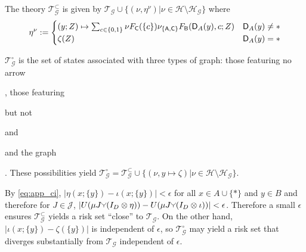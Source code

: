\begin{example}
The theory $\mathscr{T}_{\mathcal{G}}^\subset$ is given by $\mathscr{T}_{\mathcal{G}}\cup\{(\nu,\eta^\nu )|\nu \in \mathscr{H}\setminus\mathscr{H}_\mathcal{G}\}$ where 
\begin{align}
    \eta^\nu:=\begin{cases}(y;Z)\mapsto \sum_{c\in\{0,1\}} \nu F_{\mathsf{C}}(\{c\}) \nu_{\{\mathsf{A},\mathsf{C}\}} F_{\mathsf{B}}(\mathsf{D}_A(y),c;Z) &\mathsf{D}_A(y)\neq *\\
    \zeta(Z) &\mathsf{D}_A(y)=*\end{cases}
\end{align}

$\mathscr{T}_{\mathcal{G}}^\circ$ is the set of states associated with three types of graph: those featuring no arrow , those featuring  but not  and  and the graph . These possibilities yield $\mathscr{T}_{\mathcal{G}}^\circ=\mathscr{T}_{\mathcal{G}}^\subset\cup\{(\nu,y\mapsto \zeta)|\nu \in \mathscr{H}\setminus\mathscr{H}_\mathcal{G}\}$.

By \ref{eq:app_ci}, $|\eta(x;\{y\})-\iota(x;\{y\})|<\epsilon$ for all $x\in A\cup\{*\}$ and $y\in B$ and therefore for $J\in \mathscr{J}$, $|U(\mu J\splitter{0.1} (I_D\otimes \eta)) - U(\mu J\splitter{0.1} (I_D\otimes \iota))|<\epsilon$. Therefore a small $\epsilon$ ensures $\mathscr{T}^\subset_{\mathcal{G}}$ yields a risk set ``close'' to $\mathscr{T}_{\mathcal{G}}$. On the other hand, $|\iota(x;\{y\})-\zeta(\{y\})|$ is independent of $\epsilon$, so $\mathscr{T}^\circ_{\mathcal{G}}$ may yield a risk set that diverges substantially from $\mathscr{T}_{\mathcal{G}}$ independent of $\epsilon$.

\end{example}

